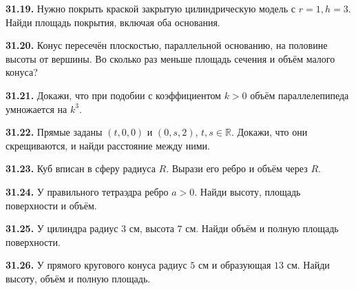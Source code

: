 \noindent\begin{minipage}[t]{\linewidth}\textbf{31.19.} Нужно покрыть краской закрытую цилиндрическую модель с \(r=1,h=3\). Найди площадь покрытия, включая оба основания.\par\end{minipage}\par
\noindent\begin{minipage}[t]{\linewidth}\textbf{31.20.} Конус пересечён плоскостью, параллельной основанию, на половине высоты от вершины. Во сколько раз меньше площадь сечения и объём малого конуса?\par\end{minipage}\par
\noindent\begin{minipage}[t]{\linewidth}\textbf{31.21.}\starmark{} Докажи, что при подобии с коэффициентом \(k>0\) объём параллелепипеда умножается на \(k^3\).\par\end{minipage}\par
\noindent\begin{minipage}[t]{\linewidth}\textbf{31.22.}\starmark{} Прямые заданы \((t,0,0)\) и \((0,s,2)\), \(t,s\in\mathbb R\). Докажи, что они скрещиваются, и найди расстояние между ними.\par\end{minipage}\par
\noindent\begin{minipage}[t]{\linewidth}\textbf{31.23.}\starmark{} Куб вписан в сферу радиуса \(R\). Вырази его ребро и объём через \(R\).\par\end{minipage}\par
\noindent\begin{minipage}[t]{\linewidth}\textbf{31.24.}\starmark{} У правильного тетраэдра ребро \(a>0\). Найди высоту, площадь поверхности и объём.\par\end{minipage}\par
\noindent\begin{minipage}[t]{\linewidth}\textbf{31.25.} У цилиндра радиус \(3\) см, высота \(7\) см. Найди объём и полную площадь поверхности.\par\end{minipage}\par
\noindent\begin{minipage}[t]{\linewidth}\textbf{31.26.} У прямого кругового конуса радиус \(5\) см и образующая \(13\) см. Найди высоту, объём и полную площадь.\par\end{minipage}\par
\endgroup
